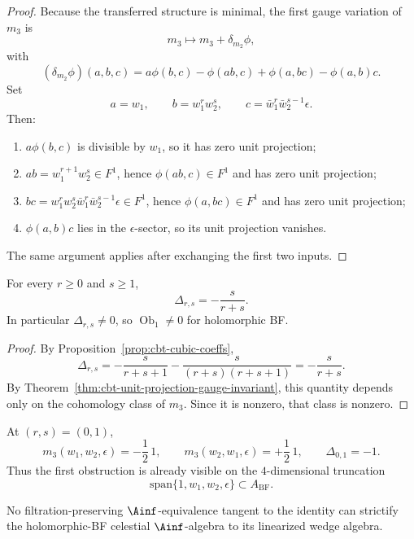\begin{proof}
Because the transferred structure is minimal, the first gauge variation of $m_3$ is
\[
m_3\mapsto m_3+\delta_{m_2}\phi,
\]
with
\[
(\delta_{m_2}\phi)(a,b,c)
=
a\phi(b,c)-\phi(ab,c)+\phi(a,bc)-\phi(a,b)c.
\]
Set
\[
a=w_1,\qquad
b=w_1^rw_2^s,\qquad
c=\bar w_1^r\bar w_2^{s-1}\epsilon.
\]
Then:
\begin{enumerate}[label=\textup{(\arabic*)},leftmargin=2em]
\item $a\phi(b,c)$ is divisible by $w_1$, so it has zero unit projection;
\item $ab=w_1^{r+1}w_2^s\in F^1$, hence $\phi(ab,c)\in F^1$ and has zero unit projection;
\item $bc=w_1^rw_2^s\bar w_1^r\bar w_2^{s-1}\epsilon\in F^1$, hence $\phi(a,bc)\in F^1$ and has zero unit projection;
\item $\phi(a,b)c$ lies in the $\epsilon$-sector, so its unit projection vanishes.
\end{enumerate}
The same argument applies after exchanging the first two inputs.
\end{proof}

\begin{theorem}
\label{thm:cbt-explicit-ob1}
\ClaimStatusProvedHere
For every $r\ge0$ and $s\ge1$,
\[
\Delta_{r,s}=-\frac{s}{r+s}.
\]
In particular $\Delta_{r,s}\neq0$, so $\operatorname{Ob}_1\neq0$ for holomorphic BF.
\end{theorem}

\begin{proof}
By Proposition~\ref{prop:cbt-cubic-coeffs},
\[
\Delta_{r,s}
=
-\frac{s}{r+s+1}-\frac{s}{(r+s)(r+s+1)}
=
-\frac{s}{r+s}.
\]
By Theorem~\ref{thm:cbt-unit-projection-gauge-invariant}, this quantity depends only on the cohomology class of $m_3$. Since it is nonzero, that class is nonzero.
\end{proof}

\begin{corollary}
\label{cor:cbt-lowest-mode}
\ClaimStatusProvedHere
At $(r,s)=(0,1)$,
\[
m_3(w_1,w_2,\epsilon)=-\frac12\,1,
\qquad
m_3(w_2,w_1,\epsilon)=+\frac12\,1,
\qquad
\Delta_{0,1}=-1.
\]
Thus the first obstruction is already visible on the $4$-dimensional truncation
\[
\mathrm{span}\{1,w_1,w_2,\epsilon\}\subset A_{\mathrm{BF}}.
\]
\end{corollary}

\begin{corollary}
\label{cor:cbt-non-strictifiability}
\ClaimStatusProvedHere
No filtration-preserving $\Ainf$-equivalence tangent to the identity can strictify the holomorphic-BF celestial $\Ainf$-algebra to its linearized wedge algebra.
\end{corollary}

